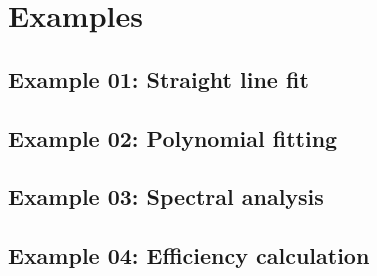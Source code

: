 \documentclass[11pt, a4paper]{article}
\begin{document}
\section{Examples}

\subsection{Example 01: Straight line fit} 

\subsection{Example 02: Polynomial fitting} 

\subsection{Example 03: Spectral analysis} 

\subsection{Example 04: Efficiency calculation} 

\end{document}
